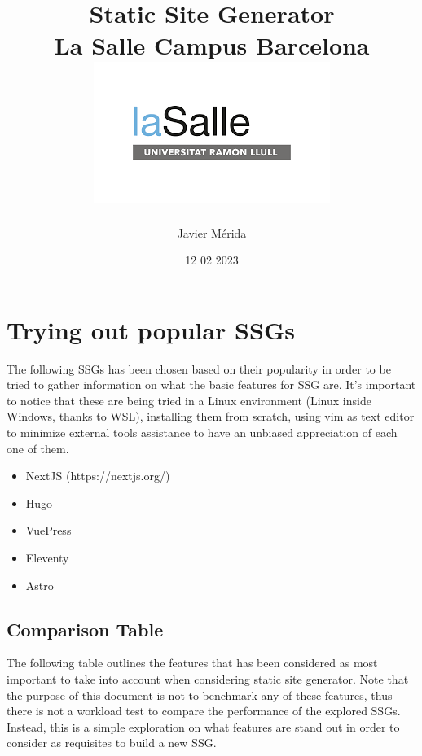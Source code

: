 \documentclass[12pt]{report}
\title{
        {Static Site Generator}\\
    {\large La Salle Campus Barcelona}\\
    {\includegraphics{lasalle-logo}}
}
\author{Javier Mérida}
\date{12 02 2023}
\begin{document}
    \maketitle

    \tableofcontents

    

    \chapter{Trying out popular SSGs}\label{ch:trying-out-popular-ssgs}

    The following SSGs has been chosen based on their popularity in order
    to be tried to gather information on what the basic features for SSG
    are.
    It's important to notice that these are being tried in a Linux environment
    (Linux inside Windows, thanks to WSL), installing them from scratch, using vim
    as text editor to minimize external tools assistance to have an unbiased appreciation
    of each one of them.

    \begin{itemize}
        \item NextJS (https://nextjs.org/)
        \item Hugo\cite{hugo}
        \item VuePress
        \item Eleventy
        \item Astro
    \end{itemize}







    \section{Comparison Table}\label{sec:comparison-table}


    The following table outlines the features that has been considered as most important to take into account when
    considering static site generator.
    Note that the purpose of this document is not to benchmark any of these features,
    thus there is not a workload test to compare the performance of the explored SSGs. Instead, this is a simple
    exploration on what features are stand out in order to consider as requisites to build a new SSG.
\end{document}

